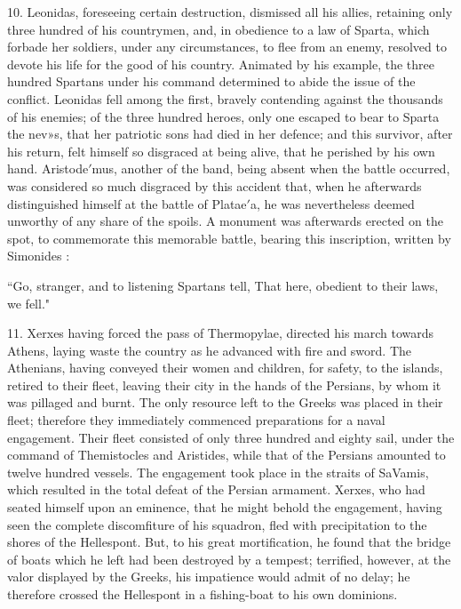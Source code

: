 \documentclass[openany,a4paper]{memoir}
\begin{document}
10. Leonidas, foreseeing certain destruction, dismissed all 
his allies, retaining only three hundred of his countrymen, 
and, in obedience to a law of Sparta, which forbade her soldiers, 
under any circumstances, to flee from an enemy, resolved to 
devote his life for the good of his country. Animated by his 
example, the three hundred Spartans under his command 
determined to abide the issue of the conflict. Leonidas fell 
among the first, bravely contending against the thousands of 
his enemies; of the three hundred heroes, only one escaped to 
bear to Sparta the nev»s, that her patriotic sons had died in 
her defence; and this survivor, after his return, felt himself 
so disgraced at being alive, that he perished by his own hand. 
Aristode$'$mus, another of the band, being absent when the 
battle occurred, was considered so much disgraced by this 
accident that, when he afterwards distinguished himself at 
the battle of Platae$'$a, he was nevertheless deemed unworthy 
of any share of the spoils. A monument was afterwards 
erected on the spot, to commemorate this memorable battle, 
bearing this inscription, written by Simonides : 

``Go, stranger, and to listening Spartans tell, 
That here, obedient to their laws, we fell." 

11. Xerxes having forced the pass of Thermopylae, directed his march towards Athens, laying waste the country 
as he advanced with fire and sword. The Athenians, having 
conveyed their women and children, for safety, to the islands, 
retired to their fleet, leaving their city in the hands of the 
Persians, by whom it was pillaged and burnt. The only resource left to the Greeks was placed in their fleet; therefore 
they immediately commenced preparations for a naval engagement. Their fleet consisted of only three hundred and 
eighty sail, under the command of Themistocles and Aristides, 
while that of the Persians amounted to twelve hundred vessels. The engagement took place in the straits of SaVamis, 
which resulted in the total defeat of the Persian armament. 
Xerxes, who had seated himself upon an eminence, that he 
might behold the engagement, having seen the complete discomfiture of his squadron, fled with precipitation to the shores 
of the Hellespont. But, to his great mortification, he found 
that the bridge of boats which he left had been destroyed by 
a tempest; terrified, however, at the valor displayed by the 
Greeks, his impatience would admit of no delay; he therefore 
crossed the Hellespont in a fishing-boat to his own dominions. 
\end{document}
